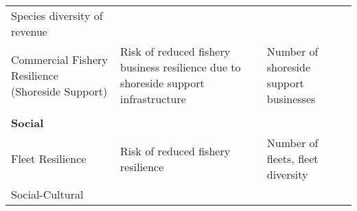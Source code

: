 \documentclass[11pt,]{article}
\begin{document}
\begin{longtable}[]{@{}lll@{}}
\begin{minipage}[t]{0.33\columnwidth}
Species diversity of revenue\strut
\end{minipage}\tabularnewline
\begin{minipage}[t]{0.25\columnwidth}\raggedright\strut
Commercial Fishery Resilience (Shoreside Support)\strut
\end{minipage} & \begin{minipage}[t]{0.33\columnwidth}\raggedright\strut
Risk of reduced fishery business resilience due to shoreside support
infrastructure\strut
\end{minipage} & \begin{minipage}[t]{0.33\columnwidth}\raggedright\strut
Number of shoreside support businesses\strut
\end{minipage}\tabularnewline
\begin{minipage}[t]{0.25\columnwidth}\raggedright\strut
\strut
\end{minipage} & \begin{minipage}[t]{0.33\columnwidth}\raggedright\strut
\strut
\end{minipage} & \begin{minipage}[t]{0.33\columnwidth}\raggedright\strut
\strut
\end{minipage}\tabularnewline
\begin{minipage}[t]{0.25\columnwidth}\raggedright\strut
\textbf{Social}\strut
\end{minipage} & \begin{minipage}[t]{0.33\columnwidth}\raggedright\strut
\strut
\end{minipage} & \begin{minipage}[t]{0.33\columnwidth}\raggedright\strut
\strut
\end{minipage}\tabularnewline
\begin{minipage}[t]{0.25\columnwidth}\raggedright\strut
Fleet Resilience\strut
\end{minipage} & \begin{minipage}[t]{0.33\columnwidth}\raggedright\strut
Risk of reduced fishery resilience\strut
\end{minipage} & \begin{minipage}[t]{0.33\columnwidth}\raggedright\strut
Number of fleets, fleet diversity\strut
\end{minipage}\tabularnewline
\begin{minipage}[t]{0.25\columnwidth}\raggedright\strut
Social-Cultural\strut
\end{minipage} & \begin{minipage}[t]{0.33\columnwidth}\raggedright\strut

\end{minipage}
\end{longtable}
\end{document}
